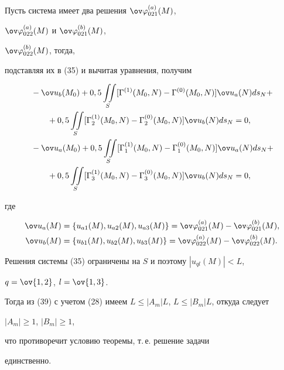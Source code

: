 \begin{pf}
Пусть система имеет два решения $\ov\varphi{}^{(a)}_{021}(M)$, 


$\ov\varphi{}^{(a)}_{022}(M)$ и $\ov\varphi{}^{(b)}_{021}(M)$, 


$\ov\varphi{}^{(b)}_{022}(M)$, тогда, 


подставляя их в (35) и вычитая уравнения, получим 


\begin{equation} 


\begin{split} 


&-\ov u_b(M_0)+0,5\iint\limits_S[\Gamma^{(1)}(M_0,N)- 


\Gamma^{(0)}(M_0,N)]\ov u_a(N)ds_N+ \\ &\qquad+


0,5\iint\limits_S[\Gamma^{(1)}_2(M_0,N)- 


\Gamma^{(0)}_2(M_0,N)]\ov u_b(N)ds_N=0,\\ 


% 


&-\ov u_a(M_0)+0,5\iint\limits_S[\Gamma^{(1)}_1(M_0,N)- 


\Gamma^{(0)}_1(M_0,N)]\ov u_a(N)ds_N+ \\ &\qquad +


0,5\iint\limits_S[\Gamma^{(1)}_3(M_0,N)- 


\Gamma^{(0)}_3(M_0,N)]\ov u_b(N)ds_N=0,


\end{split} 


\end{equation} 


где  


\begin{align*} 


\ov u_a(M)&=\{u_{a1}(M),u_{a2}(M),u_{a3}(M)\}= 


\ov\varphi{}^{(a)}_{021}(M)-\ov\varphi{}^{(b)}_{021}(M),\\ 


% 


\ov u_b(M)&=\{u_{b1}(M),u_{b2}(M),u_{b3}(M)\}= 


\ov\varphi{}^{(a)}_{022}(M)-\ov\varphi{}^{(b)}_{022}(M). 


\end{align*} 


Решения системы (35) ограничены на $S$ и поэтому $|u_{ql}(M)|<L$, 


$q=\ov{1,2}$, $l=\ov{1,3}$. 


Тогда из (39) с учетом (28) имеем $L\le|A_m|L$, $L\le|B_m|L$, откуда следует 


$|A_m|\ge1$, $|B_m|\ge1$,  


что противоречит условию теоремы, т.\,е. решение задачи  


единственно. 


\end{pf} 


